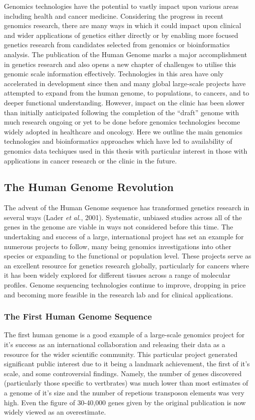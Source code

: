Genomics technologies have the potential to vastly impact upon various areas including health and cancer medicine. Considering the progress in recent genomics research, there are many ways in which it could impact upon clinical and wider applications of genetics either directly or by enabling more focused genetics research from candidates selected from genomics or bioinformatics analysis. The publication of the Human Genome marks a major accomplishment in genetics research and also opens a new chapter of challenges to utilise this genomic scale information effectively. Technologies in this area have only accelerated in development since then and many global large-scale projects have attempted to expand from the human genome, to populations, to cancers, and to deeper functional understanding. However, impact on the clinic has been slower than initially anticipated following the completion of the ``draft'' genome with much research ongoing or yet to be done before genomics technologies become widely adopted in healthcare and oncology. Here we outline the main genomics technologies and bioinformatics approaches which have led to availability of genomics data techiques used in this thesis with particular interest in those with applications in cancer research or the clinic in the future. 

\subsection{The Human Genome Revolution}
The advent of the Human Genome sequence has transformed genetics research in several ways (Lader \textit{et al.}, 2001). Systematic, unbiased studies across all of the genes in the genome are viable in ways not considered before this time. The undertaking and success of a large, international project has set an example for numerous projects to follow, many being genomics investigations into other species or expanding to the functional or population level. These projects serve as an excellent resource for genetics research globally, particularly for cancers where it has been widely explored for different tissues across a range of molecular profiles. Genome sequencing technologies continue to improve, dropping in price and becoming more feasible in the research lab and for clinical applications.

\subsubsection{The First Human Genome Sequence}
The first human genome is a good example of a large-scale genomics project for it's success as an international collaboration and releasing their data as a resource for the wider scientific community. This particular project generated significant public interest due to it being a landmark achievement, the first of it's scale, and some controversial findings. Namely, the number of genes discovered (particularly those specific to vertbrates) was much lower than most estimates of a genome of it's size and the number of repetious transposon elements was very high. Even the figure of 30-40,000 genes given by the original publication is now widely viewed as an overestimate. 

